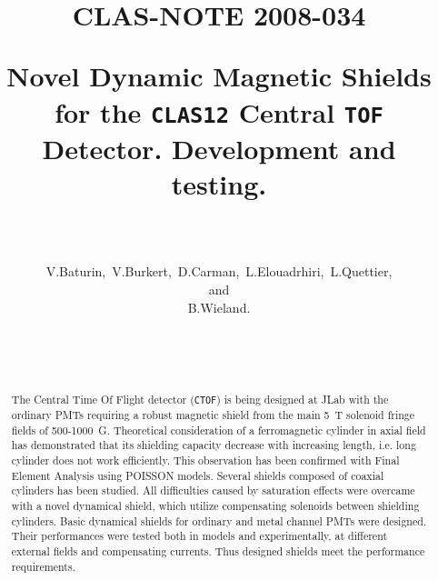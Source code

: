 \documentclass[12pt]{article}
\begin{document}
\pagestyle{plain}
%
%
%
%
\title
{
\vspace{-1.4cm}
\begin{flushright}
\normalsize{CLAS-NOTE 2008-034}
\bigskip 
\bigskip
\end{flushright}
\bigskip
{Novel Dynamic Magnetic Shields for the {\tt CLAS12} Central {\tt TOF} Detector. Development and
  testing.}
\author
{
{}\\
{}\\
\mbox
{V.Baturin, V.Burkert, D.Carman, L.Elouadrhiri, L.Quettier,}\\
{and}\\
{B.Wieland.}
{}  \\
{}  \\
\mbox
{}\\
{}\\
}
\maketitle
\begin{abstract}
The Central Time Of Flight detector ({\tt CTOF}) 
is being designed at JLab with the  
ordinary  PMTs  requiring a robust magnetic shield from the  main
5~T solenoid fringe fields of 500-1000~G. 
Theoretical consideration of a  ferromagnetic cylinder in axial field  
has demonstrated  that its  shielding capacity  decrease  with  increasing length,
 i.e. long cylinder does not work efficiently. This observation
has been confirmed with Final Element Analysis using  POISSON models.
 Several shields  composed of  coaxial cylinders has been studied.
All  difficulties caused by  saturation effects  were overcame with 
a novel dynamical shield, which utilize  compensating solenoids between shielding cylinders.
Basic dynamical shields for ordinary  and metal channel PMTs were  
designed. Their performances were tested both in models and  experimentally, 
at different external fields and compensating currents. Thus designed  
shields meet the performance requirements.  
\end{abstract}
\newpage 
\tableofcontents
\newpage
\listoftables
\newpage
\listoffigures
\newpage
}
\end{document}
